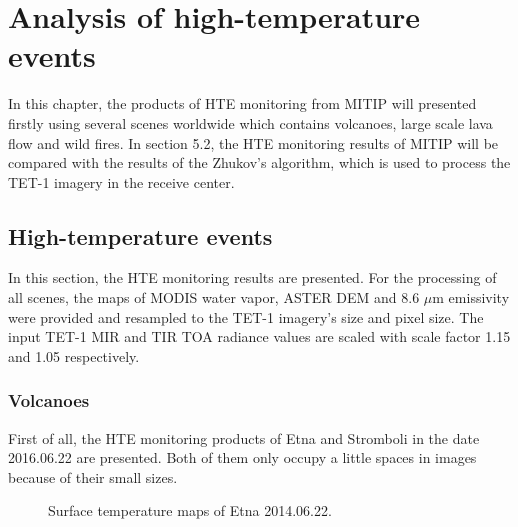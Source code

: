 \chapter{Analysis of high-temperature events}

\label{Chapter5}

In this chapter, the products of HTE monitoring from MITIP will presented firstly using several scenes worldwide which contains volcanoes, large scale lava flow and wild fires. In section 5.2, the HTE monitoring results of MITIP will be compared with the results of the Zhukov's algorithm, which is used to process the TET-1 imagery in the receive center.\\

\section{High-temperature events}
In this section, the HTE monitoring results are presented. For the processing of all scenes, the maps of MODIS water vapor, ASTER DEM and 8.6 $\mu$m emissivity were provided and resampled to the TET-1 imagery's size and pixel size. The input TET-1 MIR and TIR TOA radiance values are scaled with scale factor 1.15 and 1.05 respectively.\\


\subsection{Volcanoes}
First of all, the HTE monitoring products of Etna and Stromboli in the date 2016.06.22 are presented. Both of them only occupy a little spaces in images because of their small sizes.

\begin{figure}[!htbp]
\centering
{}
\hspace{0.1in}
\caption{Surface temperature maps of Etna 2014.06.22.}
\label{fig:Etna_sur_tem}
\end{figure}


